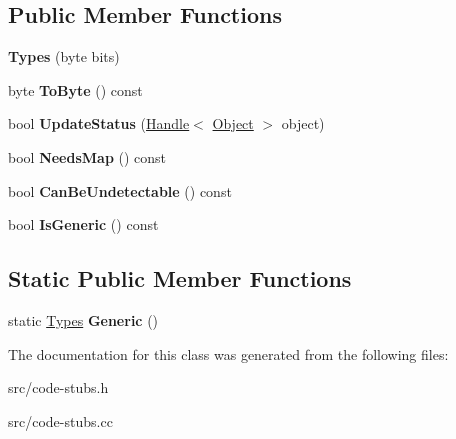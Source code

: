 \subsection*{Public Member Functions}
\begin{DoxyCompactItemize}
\item 
\hypertarget{classv8_1_1internal_1_1_to_boolean_stub_1_1_types_a6a6d00286cfe59b369e886115b0f039c}{}{\bfseries Types} (byte bits)\label{classv8_1_1internal_1_1_to_boolean_stub_1_1_types_a6a6d00286cfe59b369e886115b0f039c}

\item 
\hypertarget{classv8_1_1internal_1_1_to_boolean_stub_1_1_types_af4a9ab5af3ff7ed0da0ddfe73442d582}{}byte {\bfseries To\+Byte} () const \label{classv8_1_1internal_1_1_to_boolean_stub_1_1_types_af4a9ab5af3ff7ed0da0ddfe73442d582}

\item 
\hypertarget{classv8_1_1internal_1_1_to_boolean_stub_1_1_types_aea9f1777e3d16deb2eaa0cd4fd296851}{}bool {\bfseries Update\+Status} (\hyperlink{classv8_1_1internal_1_1_handle}{Handle}$<$ \hyperlink{classv8_1_1internal_1_1_object}{Object} $>$ object)\label{classv8_1_1internal_1_1_to_boolean_stub_1_1_types_aea9f1777e3d16deb2eaa0cd4fd296851}

\item 
\hypertarget{classv8_1_1internal_1_1_to_boolean_stub_1_1_types_a50840bf76b5d4233bbdba9d06a4a0b35}{}bool {\bfseries Needs\+Map} () const \label{classv8_1_1internal_1_1_to_boolean_stub_1_1_types_a50840bf76b5d4233bbdba9d06a4a0b35}

\item 
\hypertarget{classv8_1_1internal_1_1_to_boolean_stub_1_1_types_a7b9bd957d95a68db2b96f18af6b9a1cb}{}bool {\bfseries Can\+Be\+Undetectable} () const \label{classv8_1_1internal_1_1_to_boolean_stub_1_1_types_a7b9bd957d95a68db2b96f18af6b9a1cb}

\item 
\hypertarget{classv8_1_1internal_1_1_to_boolean_stub_1_1_types_a0fb7a3cb5cf29b61845a9071ae2f9ff0}{}bool {\bfseries Is\+Generic} () const \label{classv8_1_1internal_1_1_to_boolean_stub_1_1_types_a0fb7a3cb5cf29b61845a9071ae2f9ff0}

\end{DoxyCompactItemize}
\subsection*{Static Public Member Functions}
\begin{DoxyCompactItemize}
\item 
\hypertarget{classv8_1_1internal_1_1_to_boolean_stub_1_1_types_a676cf684a4e8129858aee592a4697957}{}static \hyperlink{classv8_1_1internal_1_1_to_boolean_stub_1_1_types}{Types} {\bfseries Generic} ()\label{classv8_1_1internal_1_1_to_boolean_stub_1_1_types_a676cf684a4e8129858aee592a4697957}

\end{DoxyCompactItemize}


The documentation for this class was generated from the following files\+:\begin{DoxyCompactItemize}
\item 
src/code-\/stubs.\+h\item 
src/code-\/stubs.\+cc\end{DoxyCompactItemize}
